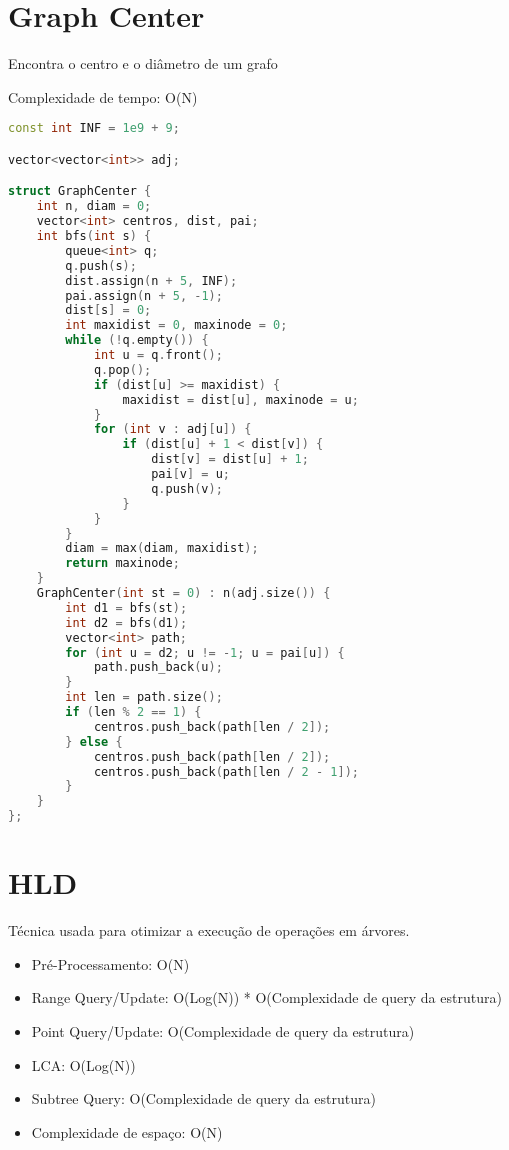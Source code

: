 \documentclass[11pt, a4paper, oneside]{book}
\begin{document}
\hfill

\section{Graph Center}


Encontra o centro e o diâmetro de um grafo



Complexidade de tempo: O(N)

\hfill

\begin{multicols}{2}
\begin{lstlisting}[language=C++]
const int INF = 1e9 + 9;

vector<vector<int>> adj;

struct GraphCenter {
    int n, diam = 0;
    vector<int> centros, dist, pai;
    int bfs(int s) {
        queue<int> q;
        q.push(s);
        dist.assign(n + 5, INF);
        pai.assign(n + 5, -1);
        dist[s] = 0;
        int maxidist = 0, maxinode = 0;
        while (!q.empty()) {
            int u = q.front();
            q.pop();
            if (dist[u] >= maxidist) {
                maxidist = dist[u], maxinode = u;
            }
            for (int v : adj[u]) {
                if (dist[u] + 1 < dist[v]) {
                    dist[v] = dist[u] + 1;
                    pai[v] = u;
                    q.push(v);
                }
            }
        }
        diam = max(diam, maxidist);
        return maxinode;
    }
    GraphCenter(int st = 0) : n(adj.size()) {
        int d1 = bfs(st);
        int d2 = bfs(d1);
        vector<int> path;
        for (int u = d2; u != -1; u = pai[u]) {
            path.push_back(u);
        }
        int len = path.size();
        if (len % 2 == 1) {
            centros.push_back(path[len / 2]);
        } else {
            centros.push_back(path[len / 2]);
            centros.push_back(path[len / 2 - 1]);
        }
    }
};
\end{lstlisting}
\end{multicols}

\hfill

\section{HLD}


Técnica usada para otimizar a execução de operações em árvores.



\begin{itemize}
\item Pré-Processamento: O(N)
\item Range Query/Update: O(Log(N)) * O(Complexidade de query da estrutura)
\item Point Query/Update: O(Complexidade de query da estrutura)
\item LCA: O(Log(N))
\item Subtree Query: O(Complexidade de query da estrutura)
\item Complexidade de espaço: O(N)
\end{itemize}
\end{document}

